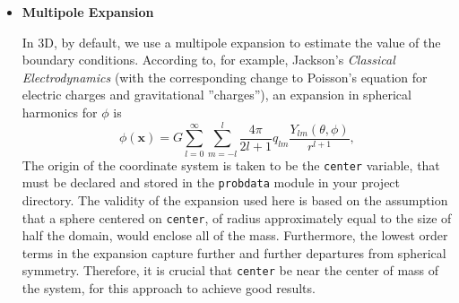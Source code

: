 \begin{itemize}
\item \textbf{Multipole Expansion}

In 3D, by default, we use a multipole expansion to estimate the value of the boundary conditions. According to, for example, Jackson's \textit{Classical Electrodynamics} (with the corresponding change to Poisson's equation for electric charges and gravitational ''charges''), an expansion in spherical harmonics for $\phi$ is
\begin{equation}
  \phi(\mathbf{x}) = G\sum_{l=0}^{\infty}\sum_{m=-l}^{l} \frac{4\pi}{2l + 1} q_{lm} \frac{Y_{lm}(\theta,\phi)}{r^{l+1}}, \label{spherical_harmonic_expansion}
\end{equation}
The origin of the coordinate system is taken to be the \texttt{center} variable, that must be declared and stored in the \texttt{probdata} module in your project directory. The validity of the expansion used here is based on the assumption that a sphere centered on \texttt{center}, of radius approximately equal to the size of half the domain, would enclose all of the mass. Furthermore, the lowest order terms in the expansion capture further and further departures from spherical symmetry. Therefore, it is crucial that \texttt{center} be near the center of mass of the system, for this approach to achieve good results.


\end{itemize}
